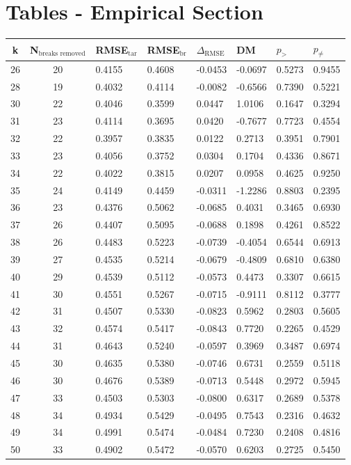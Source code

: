 \documentclass[12pt]{article}
\begin{document}
\section{Tables - Empirical Section}
\begin{table}[htp]
	\centering
	\begin{tabular}{cc|lll|lll}
		k & N$_{\text{breaks removed}}$ & RMSE$_{\text{tar}}$ & RMSE$_{\text{br}}$ & $\Delta_{\text{RMSE}}$ & DM & $p_>$ & $p_{\not =}$ \\
		\hline
		26 & 20 & 0.4155 & 0.4608 & -0.0453 & -0.0697 & 0.5273 & 0.9455 \\
		28 & 19 & 0.4032 & 0.4114 & -0.0082 & -0.6566 & 0.7390 & 0.5221 \\
		30 & 22 & 0.4046 & 0.3599 & 0.0447 & 1.0106 & 0.1647 & 0.3294 \\
		31 & 23 & 0.4114 & 0.3695 & 0.0420 & -0.7677 & 0.7723 & 0.4554 \\
		32 & 22 & 0.3957 & 0.3835 & 0.0122 & 0.2713 & 0.3951 & 0.7901 \\
		33 & 23 & 0.4056 & 0.3752 & 0.0304 & 0.1704 & 0.4336 & 0.8671 \\
		34 & 22 & 0.4022 & 0.3815 & 0.0207 & 0.0958 & 0.4625 & 0.9250 \\
		35 & 24 & 0.4149 & 0.4459 & -0.0311 & -1.2286 & 0.8803 & 0.2395 \\
		36 & 23 & 0.4376 & 0.5062 & -0.0685 & 0.4031 & 0.3465 & 0.6930 \\
		37 & 26 & 0.4407 & 0.5095 & -0.0688 & 0.1898 & 0.4261 & 0.8522 \\
		38 & 26 & 0.4483 & 0.5223 & -0.0739 & -0.4054 & 0.6544 & 0.6913 \\
		39 & 27 & 0.4535 & 0.5214 & -0.0679 & -0.4809 & 0.6810 & 0.6380 \\
		40 & 29 & 0.4539 & 0.5112 & -0.0573 & 0.4473 & 0.3307 & 0.6615 \\
		41 & 30 & 0.4551 & 0.5267 & -0.0715 & -0.9111 & 0.8112 & 0.3777 \\
		42 & 31 & 0.4507 & 0.5330 & -0.0823 & 0.5962 & 0.2803 & 0.5605 \\
		43 & 32 & 0.4574 & 0.5417 & -0.0843 & 0.7720 & 0.2265 & 0.4529 \\
		44 & 31 & 0.4643 & 0.5240 & -0.0597 & 0.3969 & 0.3487 & 0.6974 \\
		45 & 30 & 0.4635 & 0.5380 & -0.0746 & 0.6731 & 0.2559 & 0.5118 \\
		46 & 30 & 0.4676 & 0.5389 & -0.0713 & 0.5448 & 0.2972 & 0.5945 \\
		47 & 33 & 0.4503 & 0.5303 & -0.0800 & 0.6317 & 0.2689 & 0.5378 \\
		48 & 34 & 0.4934 & 0.5429 & -0.0495 & 0.7543 & 0.2316 & 0.4632 \\
		49 & 34 & 0.4991 & 0.5474 & -0.0484 & 0.7230 & 0.2408 & 0.4816 \\
		50 & 33 & 0.4902 & 0.5472 & -0.0570 & 0.6203 & 0.2725 & 0.5450 \\


\end{tabular}
\end{table}
\end{document}

